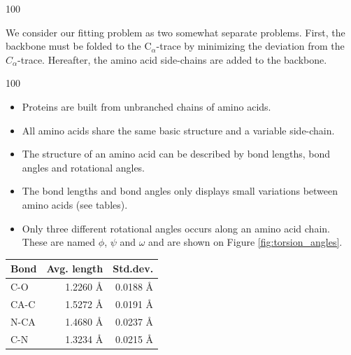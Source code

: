 \documentclass[a0,portrait]{a0poster}
\newcommand{\Ca}{C$_{\alpha}${}}
\begin{document}
\begin{GridBlock}{0}{21}{100}
\begin{multicols}{3}
We consider our fitting problem as two somewhat separate problems.
First, the backbone must be folded to the \Ca-trace by minimizing
the deviation from the $C_{\alpha}$-trace.  Hereafter, the amino acid
side-chains are added to the backbone.  



\end{multicols}
\end{GridBlock}

\begin{GridBlockFill}{0}{44}{100}

  \begin{multicols}{2}
\begin{minipage}{\linewidth} 
    \begin{multicols}{2}

    \begin{itemize}
    \item Proteins are built from unbranched chains of amino acids.
    \item All amino acids share
      the same basic structure and a variable side-chain.
    \item The structure of an amino acid can be described by bond lengths,
      bond angles and rotational angles.
    \item The bond lengths and bond angles only displays small variations
      between amino acids (see tables).
    \item Only three different rotational angles occurs along an amino
      acid chain. These are named $\phi$, $\psi$ and $\omega$ and are
      shown on Figure \ref{fig:torsion_angles}.
    \end{itemize} 
   \end{multicols}


\begin{multicols}{2}


\begin{minipage}{\linewidth} 
\centering

  \vspace{7mm}
  \begin{tabular}{lrr}
    \multicolumn{1}{c}{Bond} & \multicolumn{1}{c}{Avg. length} & \multicolumn{1}{c}{Std.dev.} \\ \midrule
    C-O   & 1.2260 Å & 0.0188 Å\\
    CA-C  & 1.5272 Å & 0.0191 Å\\
    N-CA  & 1.4680 Å & 0.0237 Å\\
    C-N   & 1.3234 Å & 0.0215 Å\\
  \end{tabular}
  \vspace{4mm}
  \label{tab:average_bond_lengths}
\end{minipage}



\end{multicols}
\end{minipage}
\end{multicols}
\end{GridBlockFill}
\end{document}
